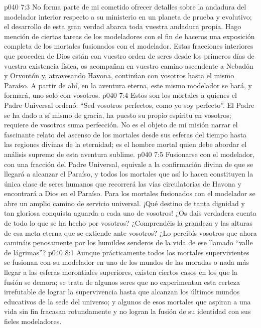 \vs p040 7:3 No forma parte de mi cometido ofrecer detalles sobre la andadura del modelador interior respecto a su ministerio en un planeta de prueba y evolutivo; el desarrollo de esta gran verdad abarca toda vuestra andadura propia. Hago mención de ciertas tareas de los modeladores con el fin de haceros una exposición completa de los mortales fusionados con el modelador. Estas fracciones interiores que proceden de Dios están con vuestro orden de seres desde los primeros días de vuestra existencia física, os acompañan en vuestro camino ascendente a Nebadón y Orvontón y, atravesando Havona, continúan con vosotros hasta el mismo Paraíso. A partir de ahí, en la aventura eterna, este mismo modelador se hará, y formará, uno solo con vosotros.
\vs p040 7:4 Estos son los mortales a quienes el Padre Universal ordenó: “Sed vosotros perfectos, como yo soy perfecto”. El Padre se ha dado a sí mismo de gracia, ha puesto su propio espíritu en vosotros;  requiere de vosotros suma perfección. No es el objeto de mi misión narrar el fascinante relato del ascenso de los mortales desde sus esferas del tiempo hasta las regiones divinas de la eternidad; es el hombre mortal quien debe abordar el análisis supremo de esta aventura sublime.
\vs p040 7:5 Fusionarse con el modelador, con una fracción del Padre Universal, equivale a la confirmación divina de que se llegará a alcanzar el Paraíso, y todos los mortales que así lo hacen constituyen la única clase de seres humanos que recorrerá las vías circulatorias de Havona y encontrará a Dios en el Paraíso. Para los mortales fusionados con el modelador se abre un amplio camino de servicio universal. ¡Qué destino de tanta dignidad y tan gloriosa conquista aguarda a cada uno de vosotros! ¿Os dais verdadera cuenta de todo lo que se ha hecho por vosotros? ¿Comprendéis la grandeza y las alturas de esa meta eterna que se extiende ante vosotros? ¿Lo percibís vosotros que ahora camináis penosamente por los humildes senderos de la vida de ese llamado “valle de lágrimas”?
\vs p040 8:1 Aunque prácticamente todos los mortales supervivientes se fusionan con su modelador en uno de los mundos de las moradas o nada más llegar a las esferas morontiales superiores, existen ciertos casos en los que la fusión se demora; se trata de algunos seres que no experimentan esta certeza irrefutable de lograr la supervivencia hasta que alcanzan los últimos mundos educativos de la sede del universo; y algunos de esos mortales que aspiran a una vida sin fin fracasan rotundamente y no logran la fusión de su identidad con sus fieles modeladores.

